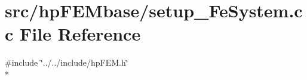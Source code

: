 \section{src/hp\-F\-E\-Mbase/setup\-\_\-\-Fe\-System.cc File Reference}
\label{setup___fe_system_8cc}
{\ttfamily \#include \char`\"{}../../include/hp\-F\-E\-M.\-h\char`\"{}}\\*
